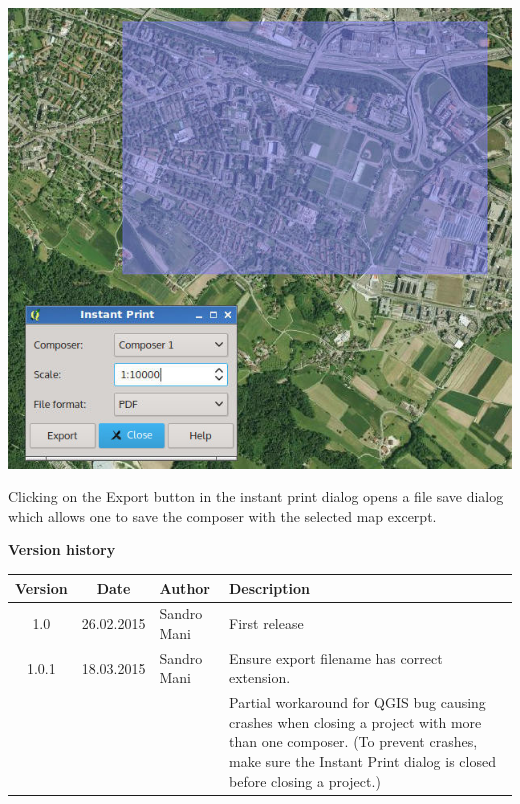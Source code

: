 \documentclass[11pt,twoside,a4paper]{report}
\begin{document}
\begin{center}
 \includegraphics[width=.5\textwidth]{img/screenshot.jpg}
\end{center}


Clicking on the Export button in the instant print dialog opens a file save dialog which allows one to save the composer with the selected map excerpt.

\newpage
{\Large{\textbf{Version history}}}
{\small{
\begin{center}
\begin{tabularx}{\textwidth}{|c|c|l|X|}
 \hline
 \textbf{Version} & \textbf{Date} & \textbf{Author} & \textbf{Description} \\\hline
 1.0   & 26.02.2015 & Sandro Mani & First release \\\hline
 1.0.1 & 18.03.2015 & Sandro Mani & Ensure export filename has correct extension. \\
       &            &             & Partial workaround for QGIS bug causing crashes when closing a project with more than one composer. (To prevent crashes, make sure the Instant Print dialog is closed before closing a project.)\\\hline
 \end{tabularx}
\end{center}
}}
\end{document}
